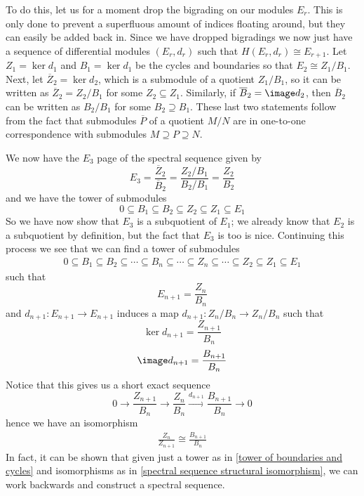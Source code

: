 To do this, let us for a moment drop the bigrading on our modules $E_r$. This is only done to prevent a superfluous amount of indices floating around, but they can easily be added back in. Since we have dropped bigradings we now just have a sequence of differential modules $(E_r,d_r)$ such that $H(E_r,d_r) \cong E_{r+1}$. Let $Z_1 = \ker d_1$ and $B_1 = \ker d_1$ be the cycles and boundaries so that $E_2 \cong Z_1 / B_1$. Next, let $\overline{Z}_2 = \ker d_2$, which is a submodule of a quotient $Z_1/B_1$, so it can be written as $\overline{Z}_2 = Z_2/B_1$ for some $Z_2 \subseteq Z_1$. Similarly, if $\overline{B}_2 = \image d_2$, then $\overline{B}_2$ can be written as $B_2/B_1$ for some $B_2 \supseteq B_1$. These last two statements follow from the fact that submodules $\overline{P}$ of a quotient $M/N$ are in one-to-one correspondence with submodules $M \supseteq P \supseteq N$.

We now have the $E_3$ page of the spectral sequence given by
\[ E_3 = \frac{\overline{Z}_2}{\overline{B}_2} = \frac{Z_2/B_1}{B_2/B_1} = \frac{Z_2}{B_2} \]
and we have the tower of submodules
\[ 0 \subseteq B_1 \subseteq B_2 \subseteq Z_2 \subseteq Z_1 \subseteq E_1 \]
So we have now show that $E_3$ is a subquotient of $E_1$; we already know that $E_2$ is a subquotient by definition, but the fact that $E_3$ is too is nice. Continuing this process we see that we can find a tower of submodules
\begin{align}
\label{tower of boundaries and cycles}
0 \subseteq B_1 \subseteq B_2 \subseteq \cdots \subseteq B_n \subseteq \cdots \subseteq Z_n \subseteq \cdots \subseteq Z_2 \subseteq Z_1 \subseteq E_1
\end{align}
such that 
\[ E_{n+1} = \frac{Z_n}{B_n} \]
and $d_{n+1} : E_{n+1} \rightarrow E_{n+1}$ induces a map $d_{n+1} : Z_n/B_n \rightarrow Z_n/B_n$ such that
\[ \ker d_{n+1} = \frac{Z_{n+1}}{B_n} \]
\[ \image d_{n+1} = \frac{B_{n+1}}{B_n} \]
Notice that this gives us a short exact sequence
\[ 0 \longrightarrow \frac{Z_{n+1}}{B_n} \longrightarrow \frac{Z_n}{B_n} \stackrel{d_{n+1}}{\longrightarrow} \frac{B_{n+1}}{B_n} \longrightarrow 0 \]
hence we have an isomorphism
\begin{align}
\label{spectral sequence structural isomorphism}
\frac{Z_n}{Z_{n+1}} \cong \frac{B_{n+1}}{B_n}
\end{align}
In fact, it can be shown that given just a tower as in \eqref{tower of boundaries and cycles} and isomorphisms as in \eqref{spectral sequence structural isomorphism}, we can work backwards and construct a spectral sequence.

